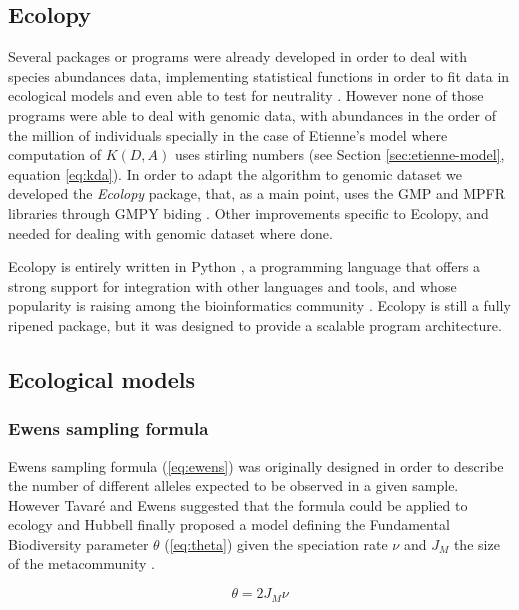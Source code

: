 \subsection{Ecolopy}

Several packages or programs were already developed in order to deal with species abundances data, implementing statistical functions in order to fit data in ecological models and even able to test for neutrality \cite{Jabot2011,Etienne2007,Hankin2007}. However none of those programs were able to deal with genomic data, with abundances in the order of the million of individuals specially in the case of Etienne's model where computation of $K(D,A)$ uses stirling numbers (see Section \ref{sec:etienne-model}, equation \ref{eq:kda}). In order to adapt the algorithm to genomic dataset we developed the \textit{Ecolopy} package, that, as a main point, uses the GMP \cite{Granlund2000} and MPFR \cite{Fousse2007} libraries through GMPY biding \cite{Martelli2007}. Other improvements specific to Ecolopy, and needed for dealing with genomic dataset where done.

Ecolopy is entirely written in Python \cite{VanRossum1991}, a programming language that offers a strong support for integration with other languages and tools, and whose popularity is raising among the bioinformatics community \cite{Bassi2007}. Ecolopy is still a fully ripened package, but it was designed to provide a scalable program architecture.

\subsection{Ecological models}

\subsubsection{Ewens sampling formula}
\label{sec:ewens-model}

Ewens sampling formula \cite{Ewens1972} (\ref{eq:ewens}) was originally designed in order to describe the number of different alleles expected to be observed in a given sample. However Tavar\'e and Ewens suggested that the formula could be applied to ecology \cite{Tavari1997} and Hubbell finally proposed a model defining the Fundamental Biodiversity parameter $\theta$ (\ref{eq:theta}) given the speciation rate $\nu$ and $J_M$ the size of the metacommunity \cite{Hubbell2001}.

\begin{equation} \label{eq:theta}
\theta = 2J_M\nu
\end{equation}

